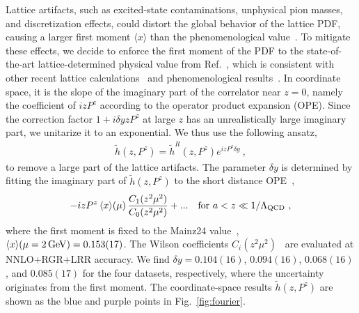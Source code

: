 \documentclass[prl,aps,twocolumn,preprintnumbers, showpacs, nofootinbib,superscriptaddress,notitlepage]{revtex4-1}
\begin{document}
Lattice artifacts, such as excited-state contaminations, unphysical pion masses, and discretization effects, could distort the global behavior of the lattice PDF, causing a larger first moment $\langle x \rangle$ than the phenomenological value~\cite{Mondal:2020ela,Alexandrou:2020qtt,Djukanovic:2024krw}. To mitigate these effects, we decide to enforce the first moment of the PDF to the state-of-the-art lattice-determined physical value from Ref.~\cite{Djukanovic:2024krw}, which is consistent with other recent lattice calculations~\cite{Mondal:2021oot,Alexandrou:2026oks} and phenomenological results~\cite{Harland-Lang:2014zoa,Hou:2019efy}. In coordinate space, it is the slope of the imaginary part of the correlator near $z=0$, namely the coefficient of $i z P^z$ according to the operator product expansion (OPE). Since the correction factor $1+i\delta y zP^z$ at large $z$ has an unrealistically large
imaginary part, we unitarize it 
to an exponential. We thus use the following ansatz, 
\begin{align}\label{eq:CalM}
\tilde{h}(z,P^z) = \tilde{h}^{R}(z,P^z) e^{i z P^z \delta y}  \ ,
\end{align}
to remove a large part of the lattice artifacts. The parameter $\delta y$ is determined by fitting the imaginary part of $\tilde{h}(z,P^z)$ to the short distance OPE~\cite{Radyushkin:2017cyf,Braun:2007wv,Izubuchi:2018srq},
\begin{align}\label{eq:SDEim}
- i z P^z \, \langle x \rangle(\mu) \, \frac{C_{1}(z^2 \mu^2)}{C_{0}(z^2 \mu^2)} + ...  \quad \text{for }  a<z\ll 1/\Lambda_{\rm QCD} \ ,
\end{align}
where the first moment is fixed to the Mainz24 value~\cite{Djukanovic:2024krw}, $\langle x \rangle(\mu=2\, {\rm GeV})=0.153(17)$.
The Wilson coefficients $C_{i}(z^2 \mu^2)$~\cite{Izubuchi:2018srq} are evaluated at NNLO+RGR+LRR accuracy. We find $\delta y = 0.104(16)$, $0.094(16)$, $0.068(16)$, and $0.085(17)$ for the four datasets, respectively, where the uncertainty originates from the first moment. The coordinate-space results $\tilde{h}(z,P^z)$ are shown as the blue and purple points in Fig.~\ref{fig:fourier}.

\end{document}
